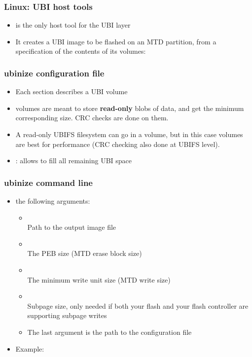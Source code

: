 \begin{frame}[fragile]
  \frametitle{Linux: UBI host tools}
  \begin{itemize}
  \item {} is the only host tool for the UBI layer
  \item It creates a UBI image to be flashed on an MTD partition,
	from a specification of the contents of its volumes:
  \end{itemize}
  
\end{frame}

\begin{frame}[fragile]
  \frametitle{ubinize configuration file}
  \begin{itemize}
  \item Each section describes a UBI volume
  \item {} volumes are meant to store {\bf read-only} blobs of data,
	and get the minimum corresponding size. CRC checks are done on
        them.
  \item A read-only UBIFS filesystem can go in a 
	volume, but in this case  volumes are best
        for performance (CRC checking also done at UBIFS level).
  \item {}: allows to fill all remaining UBI space
  \end{itemize}
  
\end{frame}

\begin{frame}
  \frametitle{ubinize command line}
  \begin{itemize}
  \item {} the following arguments:
    \begin{itemize}
    \item {}\\
	Path to the output image file
    \item {}\\
	The PEB size (MTD erase block size)
    \item {}\\
	The minimum write unit size (MTD write size)
    \item {}\\
	Subpage size, only needed if both your flash and your
	flash controller are supporting subpage writes
    \item The last argument is the path to the 
	  configuration file
    \end{itemize}
  \item Example: 
  \end{itemize}
\end{frame}

